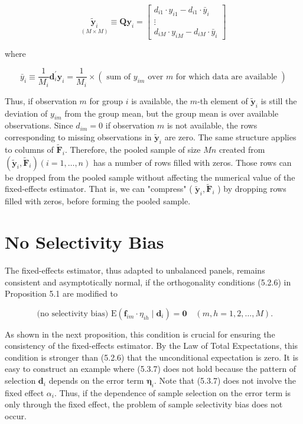 \documentclass[10pt]{article}
\begin{document}
$$
\underset{(M \times M)}{\tilde{\mathbf{y}}_{i}} \equiv \mathbf{Q} \mathbf{y}_{i}=\left[\begin{array}{c}
d_{i 1} \cdot y_{i 1}-d_{i 1} \cdot \bar{y}_{i} \\
\vdots \\
d_{i M} \cdot y_{i M}-d_{i M} \cdot \bar{y}_{i}
\end{array}\right]
$$

where


\begin{equation*}
\bar{y}_{i} \equiv \frac{1}{M_{i}} \mathbf{d}_{i}^{\prime} \mathbf{y}_{i}=\frac{1}{M_{i}} \times\left(\text { sum of } y_{i m} \text { over } m \text { for which data are available }\right) \tag{5.3.6}
\end{equation*}


Thus, if observation $m$ for group $i$ is available, the $m$-th element of $\tilde{\mathbf{y}}_{i}$ is still the deviation of $y_{i m}$ from the group mean, but the group mean is over available observations. Since $d_{i m}=0$ if observation $m$ is not available, the rows corresponding to missing observations in $\tilde{\mathbf{y}}_{i}$ are zero. The same structure applies to columns of $\widetilde{\mathbf{F}}_{i}$. Therefore, the pooled sample of size $M n$ created from $\left(\tilde{\mathbf{y}}_{i}, \tilde{\mathbf{F}}_{i}\right)(i=1, \ldots, n)$ has a number of rows filled with zeros. Those rows can be dropped from the pooled sample without affecting the numerical value of the fixed-effects estimator. That is, we can "compress" ( $\tilde{\mathbf{y}}_{i}, \tilde{\mathbf{F}}_{i}$ ) by dropping rows filled with zeros, before forming the pooled sample.

\section*{No Selectivity Bias}
The fixed-effects estimator, thus adapted to unbalanced panels, remains consistent and asymptotically normal, if the orthogonality conditions (5.2.6) in Proposition 5.1 are modified to


\begin{equation*}
\text { (no selectivity bias) } \mathrm{E}\left(\mathbf{f}_{i m} \cdot \eta_{i h} \mid \mathbf{d}_{i}\right)=\mathbf{0} \quad(m, h=1,2, \ldots, M) . \tag{5.3.7}
\end{equation*}


As shown in the next proposition, this condition is crucial for ensuring the consistency of the fixed-effects estimator. By the Law of Total Expectations, this condition is stronger than (5.2.6) that the unconditional expectation is zero. It is easy to construct an example where (5.3.7) does not hold because the pattern of selection $\mathbf{d}_{i}$ depends on the error term $\boldsymbol{\eta}_{i}$. Note that (5.3.7) does not involve the fixed effect $\alpha_{i}$. Thus, if the dependence of sample selection on the error term is only through the fixed effect, the problem of sample selectivity bias does not occur.
\end{document}
